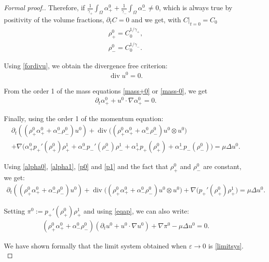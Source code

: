 \documentclass[11pt, twoside, a4paper]{article}
\theoremstyle{plain}
\theoremstyle{remark}
\numberwithin{equation}{section}
\renewcommand{\div}{\operatorname{div}}
\newcommand{\dt}{\partial_t}
\newcommand{\eps}{\varepsilon}
\newcommand{\ap}{\alpha_+}
\newcommand{\am}{\alpha_-}
\newcommand{\rp}{\rho_+}
\newcommand{\rmi}{\rho_-}
\begin{document}
\begin{proof} [Formal proof.]
Therefore, if $\displaystyle \frac{1}{\gamma_+} \int_\Omega \alpha_+^0 + \frac{1}{\gamma_-} \int_\Omega \alpha_-^0 \neq 0$, which is always true by positivity of the volume fractions, $\dt C = 0$ and we get, with $C\rvert_{t=0} = C_0$
\begin{align*}
    \rho_+^0 = C_0^{1/\gamma_+},\\
    \rho_-^0 = C_0^{1/\gamma_-}.
\end{align*}


Using \eqref{fordivu}, we obtain the divergence free criterion:
\begin{align*}
    \div u^0 =0.
\end{align*}

From the order 1 of the mass equations \eqref{mass+0} or \eqref{mass-0}, we get
\begin{align}
    \dt \alpha_+^0 + u^0 \cdot \nabla \alpha_+^0 =0.\label{eqap}
\end{align}

Finally, using the order 1 of the momentum equation:
\begin{multline*}
    \dt ( (\rho_+^0 \alpha_+^0 + \alpha_-^0 \rho_-^0) u^0) + \div \Big( (\rho_+^0 \alpha_+^0 + \alpha_-^0 \rho_-^0) u^0 \otimes u^0  \Big)\\
    + \nabla \Big( \ap^0 p_+'(\rho_+^0) \rho_+^1 + \am^0 p_-'(\rho_-^0)\rho_-^1 + \ap^1 p_+(\rp^0) + \am^1 p_-(\rmi^0) \Big) = \mu \Delta u^0.
\end{multline*}

Using \eqref{alpha0}, \eqref{alpha1}, \eqref{p0} and \eqref{p1} and the fact that $\rp^0$ and $\rmi^0$ are constant, we get:
\begin{align*}
     \dt ( (\rho_+^0 \alpha_+^0 + \alpha_-^0 \rho_-^0) u^0) + \div \Big( (\rho_+^0 \alpha_+^0 + \alpha_-^0 \rho_-^0) u^0 \otimes u^0  \Big) + \nabla \Big(  p_+'(\rho_+^0) \rho_+^1 \Big) = \mu \Delta u^0.
\end{align*}

Setting $\pi^0 :=  p_+'(\rho_+^0) \rho_+^1$ and using \eqref{eqap}, we can also write:
\begin{align*}
    (\rho_+^0 \alpha_+^0 + \alpha_-^0 \rho_-^0) \left( \dt u^0 + u^0 \cdot \nabla u^0 \right) + \nabla \pi^0 - \mu \Delta u^0 =0.
\end{align*}

We have shown formally that the limit system obtained when $\eps \to 0$ is \eqref{limitsys}.\\
\end{proof}
\end{document}
